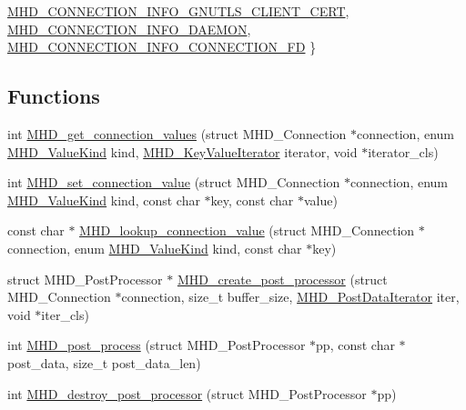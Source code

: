 \begin{DoxyCompactItemize}
\*
\hyperlink{group__request_ggacd49a2d4da7c25367ad62ce4ff030453aa23bda76d36128fc9abf1a0ffcd1983b}{\-M\-H\-D\-\_\-\-C\-O\-N\-N\-E\-C\-T\-I\-O\-N\-\_\-\-I\-N\-F\-O\-\_\-\-G\-N\-U\-T\-L\-S\-\_\-\-C\-L\-I\-E\-N\-T\-\_\-\-C\-E\-R\-T}, 
\hyperlink{group__request_ggacd49a2d4da7c25367ad62ce4ff030453a8c3e4af5ee51a70ee4be6c93d96634d0}{\-M\-H\-D\-\_\-\-C\-O\-N\-N\-E\-C\-T\-I\-O\-N\-\_\-\-I\-N\-F\-O\-\_\-\-D\-A\-E\-M\-O\-N}, 
\hyperlink{group__request_ggacd49a2d4da7c25367ad62ce4ff030453af35a29eeb48c963bae082f2771c9df2f}{\-M\-H\-D\-\_\-\-C\-O\-N\-N\-E\-C\-T\-I\-O\-N\-\_\-\-I\-N\-F\-O\-\_\-\-C\-O\-N\-N\-E\-C\-T\-I\-O\-N\-\_\-\-F\-D}
 \}
\end{DoxyCompactItemize}
\subsection*{\-Functions}
\begin{DoxyCompactItemize}
\item 
int \hyperlink{group__request_ga83634421ae2c6e00a1ba60c5acfed88c}{\-M\-H\-D\-\_\-get\-\_\-connection\-\_\-values} (struct \-M\-H\-D\-\_\-\-Connection $\ast$connection, enum \hyperlink{microhttpd_8h_ab5475b4e8aa05a99c49b3ac916cf7a3a}{\-M\-H\-D\-\_\-\-Value\-Kind} kind, \hyperlink{group__request_ga4a3cbf233bf4c7ffabeb3e85490ff464}{\-M\-H\-D\-\_\-\-Key\-Value\-Iterator} iterator, void $\ast$iterator\-\_\-cls)
\item 
int \hyperlink{group__request_ga3446d2c0bb5e22b03c79f6bc2818d767}{\-M\-H\-D\-\_\-set\-\_\-connection\-\_\-value} (struct \-M\-H\-D\-\_\-\-Connection $\ast$connection, enum \hyperlink{microhttpd_8h_ab5475b4e8aa05a99c49b3ac916cf7a3a}{\-M\-H\-D\-\_\-\-Value\-Kind} kind, const char $\ast$key, const char $\ast$value)
\item 
const char $\ast$ \hyperlink{group__request_gadef6bc2332eccb6d5f1679b11fb69b9c}{\-M\-H\-D\-\_\-lookup\-\_\-connection\-\_\-value} (struct \-M\-H\-D\-\_\-\-Connection $\ast$connection, enum \hyperlink{microhttpd_8h_ab5475b4e8aa05a99c49b3ac916cf7a3a}{\-M\-H\-D\-\_\-\-Value\-Kind} kind, const char $\ast$key)
\item 
struct \-M\-H\-D\-\_\-\-Post\-Processor $\ast$ \hyperlink{group__request_ga078ec6cdd053c967a977adc49a9e04ee}{\-M\-H\-D\-\_\-create\-\_\-post\-\_\-processor} (struct \-M\-H\-D\-\_\-\-Connection $\ast$connection, size\-\_\-t buffer\-\_\-size, \hyperlink{microhttpd_8h_a53b5201be50e62e9d7209f7866ca8893}{\-M\-H\-D\-\_\-\-Post\-Data\-Iterator} iter, void $\ast$iter\-\_\-cls)
\item 
int \hyperlink{group__request_gab6adce748b5a1f7637670b593631eb8c}{\-M\-H\-D\-\_\-post\-\_\-process} (struct \-M\-H\-D\-\_\-\-Post\-Processor $\ast$pp, const char $\ast$post\-\_\-data, size\-\_\-t post\-\_\-data\-\_\-len)
\item 
int \hyperlink{group__request_gaa53f1fa6121b0e7efa7a5bc1239f43f1}{\-M\-H\-D\-\_\-destroy\-\_\-post\-\_\-processor} (struct \-M\-H\-D\-\_\-\-Post\-Processor $\ast$pp)
\end{DoxyCompactItemize}


